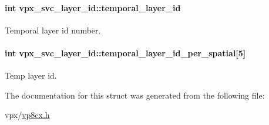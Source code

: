 \paragraph[{\texorpdfstring{temporal\+\_\+layer\+\_\+id}{temporal_layer_id}}]{\setlength{\rightskip}{0pt plus 5cm}int vpx\+\_\+svc\+\_\+layer\+\_\+id\+::temporal\+\_\+layer\+\_\+id}\hypertarget{structvpx__svc__layer__id_a365859e15e7a6ff2b06106ea00820ea7}{}\label{structvpx__svc__layer__id_a365859e15e7a6ff2b06106ea00820ea7}
Temporal layer id number. 
\paragraph[{\texorpdfstring{temporal\+\_\+layer\+\_\+id\+\_\+per\+\_\+spatial}{temporal_layer_id_per_spatial}}]{\setlength{\rightskip}{0pt plus 5cm}int vpx\+\_\+svc\+\_\+layer\+\_\+id\+::temporal\+\_\+layer\+\_\+id\+\_\+per\+\_\+spatial\mbox{[}5\mbox{]}}\hypertarget{structvpx__svc__layer__id_a72bab7b950f5687b08fd40a9b34e9500}{}\label{structvpx__svc__layer__id_a72bab7b950f5687b08fd40a9b34e9500}
Temp layer id. 

The documentation for this struct was generated from the following file\+:\begin{DoxyCompactItemize}
\item 
vpx/\hyperlink{vp8cx_8h}{vp8cx.\+h}\end{DoxyCompactItemize}
